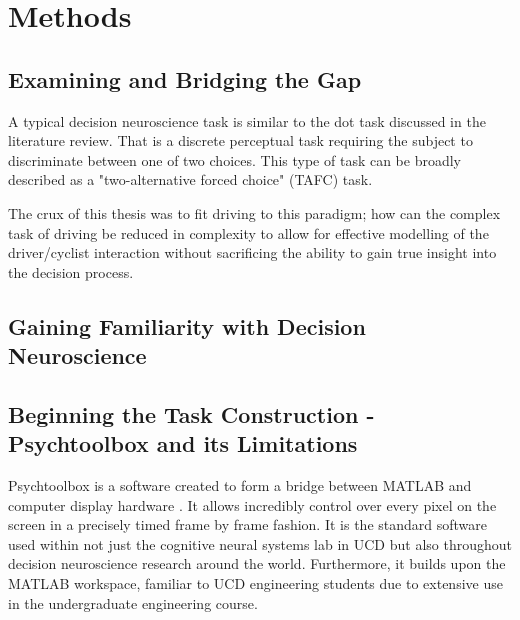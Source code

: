 \chapter{Methods}


\section{Examining and Bridging the Gap}

A typical decision neuroscience task is similar to the dot task discussed in the literature review. That is a discrete perceptual task requiring the subject to discriminate between one of two choices. This type of task can be broadly described as a "two-alternative forced choice" (TAFC) task.

The crux of this thesis was to fit driving to this paradigm; how can the complex task of driving be reduced in complexity to allow for effective modelling of the driver/cyclist interaction without sacrificing the ability to gain true insight into the decision process.


\section{Gaining Familiarity with Decision Neuroscience}

\section{Beginning the Task Construction - Psychtoolbox and its Limitations}
Psychtoolbox is a software created to form a bridge between MATLAB and computer display hardware \cite{kleinerWhatNewPsychtoolbox32007}. It allows incredibly control over every pixel on the screen in a precisely timed frame by frame fashion. It is the standard software used within not just the cognitive neural systems lab in UCD but also throughout decision neuroscience research around the world. Furthermore, it builds upon the MATLAB workspace, familiar to UCD engineering students due to extensive use in the undergraduate engineering course.

